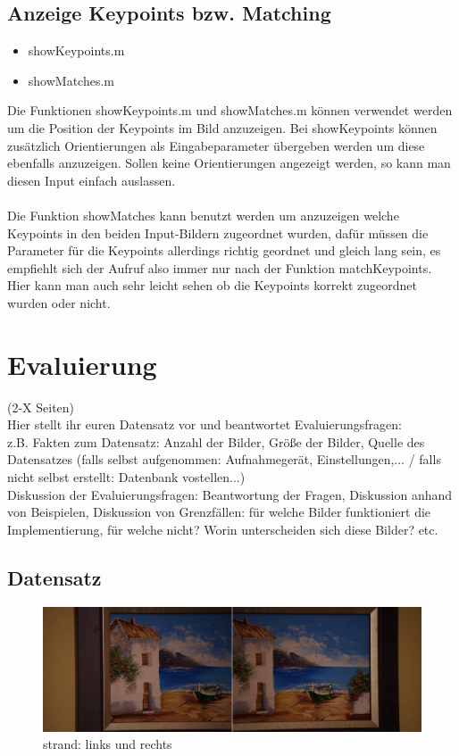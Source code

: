 \documentclass[deutsch]{scrartcl}
\begin{document}
\subsection{Anzeige Keypoints bzw. Matching}
\begin{itemize}
	\item showKeypoints.m
	\item showMatches.m
\end{itemize}
Die Funktionen showKeypoints.m und showMatches.m können verwendet werden um die Position der Keypoints im Bild anzuzeigen. Bei showKeypoints können zusätzlich Orientierungen als Eingabeparameter übergeben werden um diese ebenfalls anzuzeigen. Sollen keine Orientierungen angezeigt werden, so kann man diesen Input einfach auslassen.\\\\
Die Funktion showMatches kann benutzt werden um anzuzeigen welche Keypoints in den beiden Input-Bildern zugeordnet wurden, dafür müssen die Parameter für die Keypoints allerdings richtig geordnet und gleich lang sein, es empfiehlt sich der Aufruf also immer nur nach der Funktion matchKeypoints. Hier kann man auch sehr leicht sehen ob die Keypoints korrekt zugeordnet wurden oder nicht.

\newpage
\section{Evaluierung}
(2-X Seiten)\\
Hier stellt ihr euren Datensatz vor und beantwortet Evaluierungsfragen:\\
z.B. Fakten zum Datensatz: Anzahl der Bilder, Größe der Bilder, Quelle des Datensatzes (falls selbst aufgenommen: Aufnahmegerät, Einstellungen,... / falls nicht selbst erstellt: Datenbank vostellen...)\\
Diskussion der Evaluierungsfragen: Beantwortung der Fragen, Diskussion anhand von Beispielen, Diskussion von Grenzfällen: für welche Bilder funktioniert die Implementierung, für welche nicht? Worin unterscheiden sich diese Bilder? etc.

\subsection{Datensatz}

\begin{figure}
\begin{center}
\includegraphics[width=1.0\textwidth]{strand.jpg}
\caption{strand: links und rechts}
\label{fig:strand}
\end{center}
\end{figure}
\end{document}
